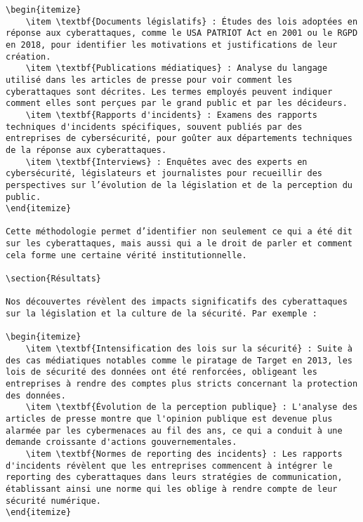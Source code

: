 \documentclass{article}
\begin{document}
\begin{verbatim}
\begin{itemize}
    \item \textbf{Documents législatifs} : Études des lois adoptées en réponse aux cyberattaques, comme le USA PATRIOT Act en 2001 ou le RGPD en 2018, pour identifier les motivations et justifications de leur création.
    \item \textbf{Publications médiatiques} : Analyse du langage utilisé dans les articles de presse pour voir comment les cyberattaques sont décrites. Les termes employés peuvent indiquer comment elles sont perçues par le grand public et par les décideurs.
    \item \textbf{Rapports d'incidents} : Examens des rapports techniques d'incidents spécifiques, souvent publiés par des entreprises de cybersécurité, pour goûter aux départements techniques de la réponse aux cyberattaques.
    \item \textbf{Interviews} : Enquêtes avec des experts en cybersécurité, législateurs et journalistes pour recueillir des perspectives sur l’évolution de la législation et de la perception du public.
\end{itemize}

Cette méthodologie permet d’identifier non seulement ce qui a été dit sur les cyberattaques, mais aussi qui a le droit de parler et comment cela forme une certaine vérité institutionnelle.

\section{Résultats}

Nos découvertes révèlent des impacts significatifs des cyberattaques sur la législation et la culture de la sécurité. Par exemple :

\begin{itemize}
    \item \textbf{Intensification des lois sur la sécurité} : Suite à des cas médiatiques notables comme le piratage de Target en 2013, les lois de sécurité des données ont été renforcées, obligeant les entreprises à rendre des comptes plus stricts concernant la protection des données.
    \item \textbf{Évolution de la perception publique} : L'analyse des articles de presse montre que l'opinion publique est devenue plus alarmée par les cybermenaces au fil des ans, ce qui a conduit à une demande croissante d'actions gouvernementales.
    \item \textbf{Normes de reporting des incidents} : Les rapports d'incidents révèlent que les entreprises commencent à intégrer le reporting des cyberattaques dans leurs stratégies de communication, établissant ainsi une norme qui les oblige à rendre compte de leur sécurité numérique.
\end{itemize}


\end{verbatim}
\end{document}
